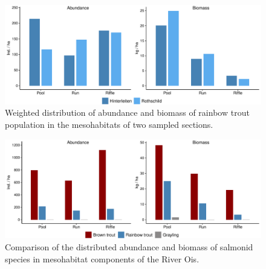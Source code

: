 \begin{figure}[!htb]                              %
	\center
	\includegraphics[width=.9\textwidth]{images/rainbow_trout.pdf}                %
	\caption{Weighted distribution of abundance and biomass of rainbow trout population in the mesohabitats of two sampled sections.}        %
	\label{fig:AB_rainbow}                                                       %
\end{figure}


\begin{figure}[!htb]                              %
	\center
	\includegraphics[width=.9\textwidth]{images/mesohabitat.pdf}                %
	\caption{Comparison of the distributed abundance and biomass of salmonid species in mesohabitat components of the River Ois.}        %
	\label{fig:AB_meso}                                                       %
\end{figure}

